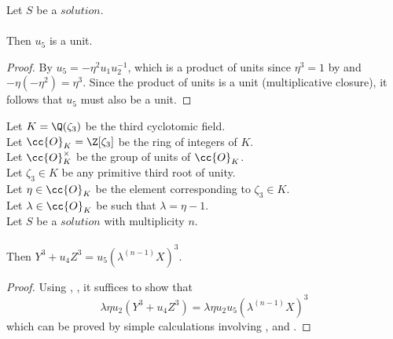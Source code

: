 \begin{lemma}
  \label{lmm:u₅_isUnit}
  \leanok
  Let $S$ be a $solution$.\\\\
  Then $u_5$ is a unit.
\end{lemma}
\begin{proof}
  \leanok
  By  $u_5 = -\eta^2 u_1 u_2^{-1}$,
  which is a product of units since $\eta^3 = 1$ by  and
  $-\eta (-\eta^2) = \eta^3$.
  Since the product of units is a unit (multiplicative closure),
  it follows that $u_5$ must also be a unit.
\end{proof}

\begin{lemma}
  \label{lmm:formula2}
  \leanok
  Let $K = \Q(\zeta_3)$ be the third cyclotomic field. \\
  Let $\cc{O}_K = \Z[\zeta_3]$ be the ring of integers of $K$. \\
  Let $\cc{O}^\times_K$ be the group of units of $\cc{O}_K$. \\
  Let $\zeta_3 \in K$ be any primitive third root of unity. \\
  Let $\eta \in \cc{O}_K$ be the element corresponding to $\zeta_3 \in K$. \\
  Let $\lambda \in \cc{O}_K$ be such that $\lambda = \eta -1$. \\
  Let $S$ be a $solution$ with multiplicity $n$.\\\\
  Then $Y^3 + u_4 Z^3 = u_5 (\lambda^(n-1) X)^3$.
\end{lemma}
\begin{proof}
  \leanok
  Using , , it suffices to show that
  $$\lambda \eta u_2 (Y^3 + u_4 Z^3) = \lambda \eta u_2 u_5 (\lambda^(n-1) X)^3$$
  which can be proved by simple calculations involving ,
   and .
\end{proof}

